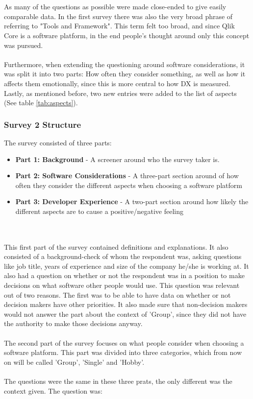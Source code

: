 \documentclass{cslthse-msc}
\begin{document}
    \\ \\
    As many of the questions as possible were made close-ended to give easily comparable data. In the first survey there was also the very broad phrase of referring to "Tools and Framework". This term felt too broad, and since Qlik Core is a software platform, in the end people's thought around only this concept was pursued.
    \\ \\
    Furthermore, when extending the questioning around software considerations, it was split it into two parts: How often they consider something, as well as how it affects them emotionally, since this is more central to how DX is measured. Lastly, as mentioned before, two new entries were added to the list of aspects (See table \ref{tab:aspects}).

    \subsubsection{Survey 2 Structure}

    The survey consisted of three parts:
    \begin{itemize}[label={}]
        \item \textbf{Part 1: Background} - A screener around who the survey taker is.
        \item \textbf{Part 2: Software Considerations} - A three-part section around of how often they consider the different aspects when choosing a software platform
        \item \textbf{Part 3: Developer Experience} - A two-part section around how likely the different aspects are to cause a positive/negative feeling
    \end{itemize}
    \\ \\
    This first part of the survey contained definitions and explanations. It also consisted of a background-check of whom the respondent was, asking questions like job title, years of experience and size of the company he/she is working at. It also had a question on whether or not the respondent was in a position to make decisions on what software other people would use. This question was relevant out of two reasons. The first was to be able to have data on whether or not decision makers have other priorities. It also made sure that non-decision makers would not answer the part about the context of 'Group', since they did not have the authority to make those decisions anyway.
    \\ \\
    The second part of the survey focuses on what people consider when choosing a
    software platform. This part was divided into three categories, which
    from now on will be called 'Group', 'Single' and 'Hobby'.
    \\ \\
    The questions were the same in these three prats, the only
    different was the context given. The question was:
\end{document}
